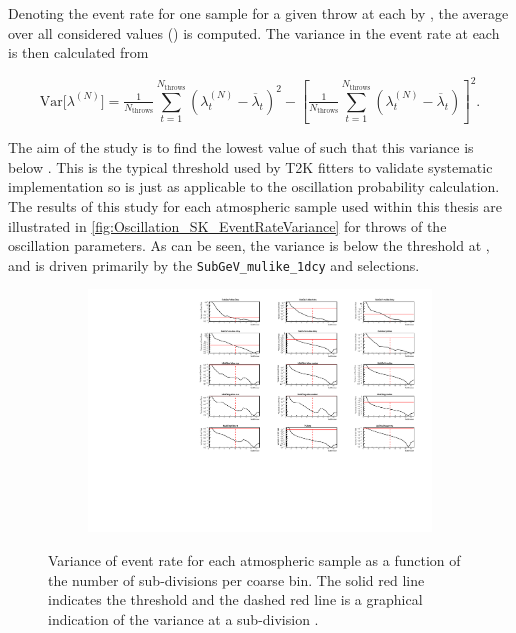 Denoting the event rate for one sample for a given throw  at each  by , the average over all considered  values () is computed. The variance in the event rate at each  is then calculated from

\begin{equation}
  \mathrm{Var}\Big[\lambda^{(N)}] = \tfrac{1}{N_\mathrm{throws}} \sum_{t=1}^{N_\mathrm{throws}} \left(\lambda_t^{(N)} - \overline \lambda_t\right)^2 - \left[\tfrac{1}{N_\mathrm{throws}} \sum_{t=1}^{N_\mathrm{throws}} \left(\lambda_t^{(N)} - \overline \lambda_t\right)\right]^2 .
  \label{eq:Oscillation_SK_Variance}
\end{equation}

The aim of the study is to find the lowest value of  such that this variance is below . This is the typical threshold used by T2K fitters to validate systematic implementation so is just as applicable to the oscillation probability calculation. The results of this study for each atmospheric sample used within this thesis are illustrated in \autoref{fig:Oscillation_SK_EventRateVariance} for  throws of the oscillation parameters. As can be seen, the variance is below the threshold at , and is driven primarily by the \texttt{SubGeV\_mulike\_1dcy} and  selections.

\begin{figure}[h]
  \begin{subfigure}[t]{\textwidth}
    \includegraphics[width=\textwidth, trim={0mm 0mm 0mm 0mm}, clip,page=1]{Figures/Oscillation/EventRate_VarianceGraphs.pdf}
  \end{subfigure}
  \caption{Variance of event rate for each atmospheric sample as a function of the number of sub-divisions per coarse bin. The solid red line indicates the  threshold and the dashed red line is a graphical indication of the variance at a sub-division .}
  \label{fig:Oscillation_SK_EventRateVariance}
\end{figure}

